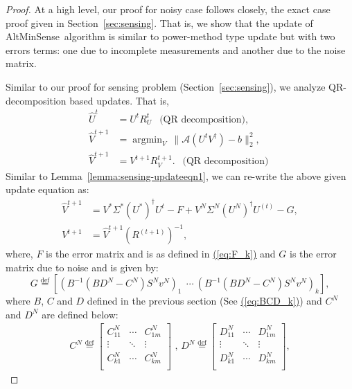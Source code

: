 \documentclass[11pt]{article}
\renewcommand{\eqref}[1]{\hyperref[#1]{(\ref*{#1})}}
\theoremstyle{plain}
\theoremstyle{definition}
\newcommand{\eqdef}{\stackrel{\textrm{def}}{=}}
\DeclareMathOperator*{\argmin}{argmin}
\newcommand{\aff}{{\mathcal A}}
\newcommand{\Vt}{V^{t+1}}
\newcommand{\Vht}{\widehat{V}^{t+1}}
\newcommand{\Ut}{U^{t}}
\newcommand{\Rt}{R^{(t+1)}}
\newcommand{\Vo}{V^*}
\newcommand{\So}{\Sigma^*}
\newcommand{\Uo}{U^*}
\newcommand{\Un}{U^N}
\newcommand{\Vn}{V^N}
\newcommand{\Sn}{\Sigma^N}
\newcommand{\as}{AltMinSense\ }
\begin{document}
\begin{proof}
At a high level, our proof for noisy case follows closely, the exact case proof given in Section~\ref{sec:sensing}. That is, we show that the update of \as algorithm is similar to power-method type update but with two errors terms: one due to incomplete measurements and another due to the noise matrix.

Similar to our proof for sensing problem (Section~\ref{sec:sensing}), we analyze QR-decomposition based updates. That is,
\begin{align*}
\widehat{U}^{t}&= U^{t}R_U^{t}\ \ \text{ (QR decomposition), }\\
\widehat{V}^{t+1}&=\argmin_{V} \  \|\aff(U^t V^\dag )-b\|_2^2,\\ 
\widehat{V}^{t+1}&=V^{t+1}R_V^{t+1}.\ \ \text{ (QR decomposition) }
\end{align*}
Similar to Lemma~\ref{lemma:sensing-updateeqn1}, we can re-write the above given update equation as:
\begin{align}
  \Vht&=\Vo\So(\Uo)^\dag\Ut-F+\Vn \Sn (\Un)^{\dag}U^{(t)}-G,\nonumber\\
  \Vt&=\Vht(\Rt)^{-1},\label{eq:noisy_update_k}
\end{align}
where, $F$ is the error matrix and is as defined in \eqref{eq:F_k} and $G$ is the error matrix due to noise and is given by:
\begin{equation}\label{eq:G_k}
G \eqdef \left[ 
\left(B^{-1}\left(BD^N-C^N\right)S^Nv^N\right)_1\ \ \cdots\ 
 \left(B^{-1}\left(BD^N-C^N\right)S^Nv^N\right)_k
 \right],
\end{equation}
where $B$, $C$ and $D$ defined in the previous section (See \eqref{eq:BCD_k}) and $C^N$ and $D^N$ are defined below:
\begin{align*}
 C^N \eqdef \left[\begin{array}{ccc}
                 C_{11}^N & \cdots & C_{1m}^N \\
		 \vdots &  \ddots &\vdots \\
                 C_{k1}^N & \cdots & C_{km}^N \\
                \end{array} \right]
\mbox{ , }
 D^N \eqdef \left[\begin{array}{ccc}
                 D_{11}^N & \cdots & D_{1m}^N \\
		 \vdots &  \ddots &\vdots \\
                 D_{k1}^N &  \cdots & D_{km}^N \\
                \end{array} \right],

\end{align*}
\end{proof}
\end{document}
